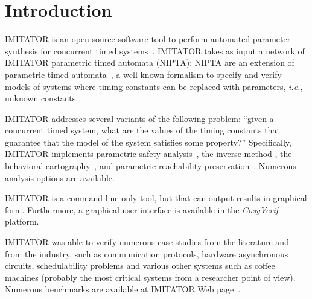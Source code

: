 \documentclass[a4paper,11pt]{report}
\newcommand{\CosyVerif}{\emph{CosyVerif}}
\newcommand{\imitator}{\textsf{IMITATOR}}
\newcommand{\NIPTA}{NIPTA}
\newcommand{\imitatorversion}{2.7}
\newcommand{\ie}{\textcolor{colorok}{\textit{i.e.}, }}
\begin{document}

\newpage

\tableofcontents
{}

\newpage




\chapter{Introduction}

\imitator{} is an open source software tool to perform automated parameter synthesis for concurrent timed systems~\cite{AFKS12}.
\imitator{} takes as input a network of \imitator{} parametric timed automata (\NIPTA{}): \NIPTA{} are an extension of parametric timed automata~\cite{AHV93}, a well-known formalism to specify and verify models of systems where timing constants can be replaced with parameters, \ie{} unknown constants.

\imitator{} addresses several variants of the following problem:
``given a concurrent timed system, what are the values of the timing constants that guarantee that the model of the system satisfies some property?''
Specifically, \imitator{} implements parametric safety analysis~\cite{AHV93,JLR15}, the inverse method \cite{ACEF09,AM15}, the behavioral cartography~\cite{AF10}, and parametric reachability preservation~\cite{ALNS15}.
Numerous analysis options are available.

\imitator{} is a command-line only tool, but that can output results in graphical form.
Furthermore, a graphical user interface is available in the \CosyVerif{} platform.

\imitator{} was able to verify numerous case studies from the literature and from the industry, such as communication protocols, hardware asynchronous circuits, schedulability problems and various other systems such as coffee machines (probably the most critical systems from a researcher point of view).
Numerous benchmarks are available at \imitator{} Web page~\cite{imitator}.
\end{document}
